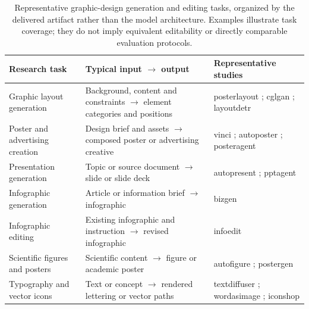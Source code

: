 \begin{table}[t]
\centering
\caption{Representative graphic-design generation and editing tasks, organized by the delivered artifact rather than the model architecture.
Examples illustrate task coverage; they do not imply equivalent editability or directly comparable evaluation protocols.}
\label{tab:task-grounding}
\footnotesize
\renewcommand{\arraystretch}{1.18}
\begin{tabularx}{\textwidth}{@{}p{}p{}X@{}}
\toprule
\textbf{Research task} & \textbf{Typical input $\rightarrow$ output} & \textbf{Representative studies}\\
\midrule
Graphic layout generation
& Background, content and constraints $\rightarrow$ element categories and positions
& \ac{posterlayout} \citep{posterlayout2023}; \ac{cglgan} \citep{cglgan2022}; \ac{layoutdetr} \citep{layoutdetr2024}\\
\addlinespace[0.35em]
Poster and advertising creation
& Design brief and assets $\rightarrow$ composed poster or advertising creative
& \ac{vinci} \citep{vinci2021}; \ac{autoposter} \citep{autoposter2023}; \ac{posteragent} \citep{posteragent2026}\\
\addlinespace[0.35em]
Presentation generation
& Topic or source document $\rightarrow$ slide or slide deck
& \ac{autopresent} \citep{autopresent2025}; \ac{pptagent} \citep{pptagent2025}\\
\addlinespace[0.35em]
Infographic generation
& Article or information brief $\rightarrow$ infographic
& \ac{bizgen} \citep{bizgen2025}\\
\addlinespace[0.35em]
Infographic editing
& Existing infographic and instruction $\rightarrow$ revised infographic
& \ac{infoedit} \citep{yang2026infoedit}\\
\addlinespace[0.35em]
Scientific figures and posters
& Scientific content $\rightarrow$ figure or academic poster
& \ac{autofigure} \citep{autofigure2026}; \ac{postergen} \citep{postergen2026}\\
\addlinespace[0.35em]
Typography and vector icons
& Text or concept $\rightarrow$ rendered lettering or vector paths
& \ac{textdiffuser} \citep{textdiffuser2023}; \ac{wordasimage} \citep{wordasimage2023}; \ac{iconshop} \citep{iconshop2023}\\
\bottomrule
\end{tabularx}
\end{table}
